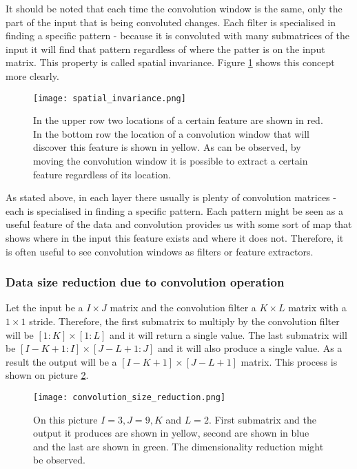 \documentclass[a4paper,10pt]{report}
\begin{document}
	  It should be noted that each time the convolution window is the same, only the part of the input that is being convoluted changes. Each filter is specialised in finding a specific pattern - because it is convoluted with many submatrices of the input it will find that pattern regardless of where the patter is on the input matrix. This property is called spatial invariance. Figure \ref{fig:spatial_invariance} shows this concept more clearly.\\
	  	  
	  \begin{figure}[h!]
	    \centering
	    \texttt{[image: spatial\_invariance.png]}
	    \caption{In the upper row two locations of a certain feature are shown in red. In the bottom row the location of a convolution window that will discover this feature is shown in yellow. As can be observed, by moving the convolution window it is possible to extract a certain feature regardless of its location.}
	    \label{fig:spatial_invariance}
	  \end{figure} 
	  
	  
	  As stated above, in each layer there usually is plenty of convolution matrices - each is specialised in finding a specific pattern. Each pattern might be seen as a useful feature of the data and convolution provides us with some sort of map that shows where in the input this feature exists and where it does not. Therefore, it is often useful to see convolution windows as filters or feature extractors.\\
	  
	  \subsubsection{Data size reduction due to convolution operation}
	  
 	  Let the input be a $I\times J$ matrix and the convolution filter a $K\times L$ matrix with a $1\times1$ stride. Therefore, the first submatrix to multiply by the convolution filter will be $[1:K]\times[1:L]$ and it will return a single value. The last submatrix will be $[I-K+1:I]\times[J-L+1:J]$ and it will also produce a  single value. As a result the output will be a $[I-K+1]\times[J-L+1]$ matrix. This process is shown on picture \ref{fig:convolution_size_reduction}.\\
	  
	  
	  \begin{figure}[h!]
	    \centering
	    \texttt{[image: convolution\_size\_reduction.png]}
	    \caption{On this picture $I = 3, J = 9, K$ and $L = 2$. First submatrix and the output it produces are shown in yellow, second are shown in blue and the last are shown in green. The dimensionality reduction might be observed.}
	    \label{fig:convolution_size_reduction}
	  \end{figure} 
	  
\end{document}
